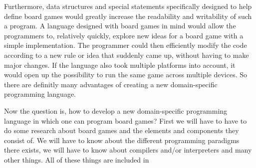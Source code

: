 Furthermore, data structures and special statements specifically designed to help define board games would greatly increase the readability and writability of such a program. A language designed with board games in mind would allow the programmers to, relatively quickly, explore new ideas for a board game with a simple implementation. The programmer could then efficiently modify the code according to a new rule or idea that suddenly came up, without having to make major changes. If the language also took multiple platforms into account, it would open up the possibility to run the same game across multiple devices. So there are definitly many advantages of creating a new domain-specific programming language. 

Now the question is, how to develop a new domain-specific programming language in which one can program board games? First we will have to have to do some research about board games and the elements and components they consist of. We will have to know about the different programming paradigms there exists, we will have to know about compilers and/or interpreters and many other things. All of these things are included in 

%
%
